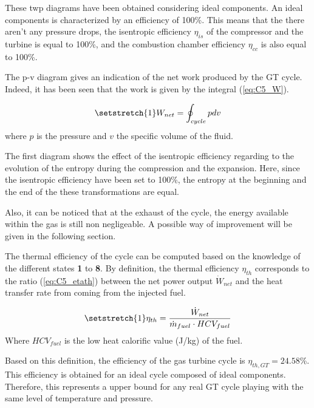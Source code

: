 These twp diagrams have been obtained considering ideal components. An ideal components is characterized by an efficiency of 100\%. This means that the there aren't any pressure drops, the isentropic efficiency $\eta_{is}$ of the compressor and the turbine is equal to 100\%, and the combustion chamber efficiency $\eta_{cc}$ is also equal to 100\%.

The p-v diagram gives an indication of the net work produced by the GT cycle. Indeed, it has been seen that the work is given by the integral (\ref{eq:C5_W}).

\begin{equation}
    \setstretch{1}
    W_{net} = \oint_{cycle}pdv\label{eq:C5_W}
\end{equation}
where $p$ is the pressure and $v$ the specific volume of the fluid.

The first diagram shows the effect of the isentropic efficiency regarding to the evolution of the entropy during the compression and the expansion. Here, since the isentropic efficiency have been set to 100\%, the entropy at the beginning and the end of the these transformations are equal.

Also, it can be noticed that at the exhaust of the cycle, the energy available within the gas is still non negligeable. A possible way of improvement will be given in the following section.

The thermal efficiency of the cycle can be computed based on the knowledge of the different states \textbf{1} to \textbf{8}. By definition, the thermal efficiency $\eta_{th}$ corresponds to the ratio (\ref{eq:C5_etath}) between the net power output $\dot{W}_{net}$ and the heat transfer rate from coming from the injected fuel.

\begin{equation}
    \setstretch{1}
    \eta_{th} = \frac{\dot{W}_{net}}{\dot{m}_{fuel}\cdot HCV_{fuel}} \label{eq:C5_etath}
\end{equation}
Where $HCV_{fuel}$ is the low heat calorific value (J/kg) of the fuel.

Based on this definition, the efficiency of the gas turbine cycle is $\eta_{th,GT} =24.58$\%. This efficiency is obtained for an ideal cycle composed of ideal components. Therefore, this represents a upper bound for any real GT cycle playing with the same level of temperature and pressure.

